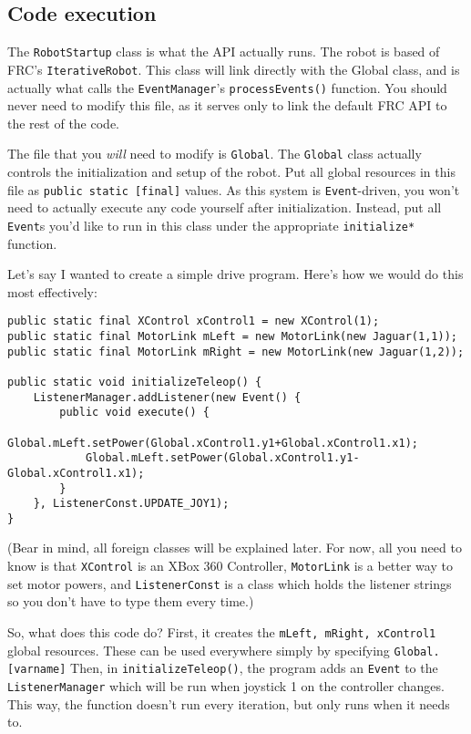 \documentclass[a4paper]{article}
\begin{document}
\subsection{Code execution}The \lstinline{RobotStartup} class is what the API actually runs. The robot is based of FRC's \lstinline{IterativeRobot}. This class will link directly with the Global class, and is actually what calls the \lstinline{EventManager}'s \lstinline{processEvents()} function. You should never need to modify this file, as it serves only to link the default FRC API to the rest of the code.

The file that you \textit{will} need to modify is \lstinline{Global}. The \lstinline{Global} class actually controls the initialization and setup of the robot. Put all global resources in this file as \lstinline{public static [final]} values. As this system is \lstinline{Event}-driven, you won't need to actually execute any code yourself after initialization. Instead, put all \lstinline{Event}s you'd like to run in this class under the appropriate \lstinline{initialize*} function.

Let's say I wanted to create a simple drive program. Here's how we would do this most effectively:

\begin{lstlisting}
public static final XControl xControl1 = new XControl(1);
public static final MotorLink mLeft = new MotorLink(new Jaguar(1,1));
public static final MotorLink mRight = new MotorLink(new Jaguar(1,2));

public static void initializeTeleop() {
    ListenerManager.addListener(new Event() {
        public void execute() {
            Global.mLeft.setPower(Global.xControl1.y1+Global.xControl1.x1);
            Global.mLeft.setPower(Global.xControl1.y1-Global.xControl1.x1);
        }
    }, ListenerConst.UPDATE_JOY1);
}\end{lstlisting}

(Bear in mind, all foreign classes will be explained later. For now, all you need to know is that \lstinline{XControl} is an XBox 360 Controller, \lstinline{MotorLink} is a better way to set motor powers, and \lstinline{ListenerConst} is a class which holds the listener strings so you don't have to type them every time.)

So, what does this code do? First, it creates the \lstinline{mLeft, mRight, xControl1} global resources. These can be used everywhere simply by specifying \lstinline{Global.[varname]} Then, in \lstinline{initializeTeleop()}, the program adds an \lstinline{Event} to the \lstinline{ListenerManager} which will be run when joystick 1 on the controller changes. This way, the function doesn't run every iteration, but only runs when it needs to.
\end{document}
